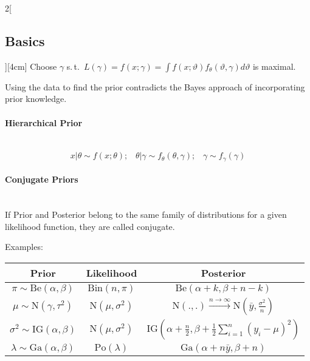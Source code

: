 \documentclass[8pt]{extarticle}
\begin{document}
\begin{multicols}{2}[\subsection{Basics}][4cm]
\noindent Choose $\gamma$ s.\,t.\ $L(\gamma) = f(x;\gamma) = \int f(x;\vartheta) f_\theta(\vartheta, \gamma)d\vartheta$ is maximal.

\noindent Using the data to find the prior contradicts the Bayes approach of incorporating prior knowledge.

\paragraph{Hierarchical Prior} \ \\

$$x|\theta \sim f(x;\theta);\;\;\; \theta|\gamma \sim f_\theta(\theta, \gamma);\;\;\; \gamma \sim f_\gamma(\gamma)$$

\paragraph{Conjugate Priors}

\begin{Extensiv}
~\\
  \noindent If Prior and Posterior belong to the same family of distributions for a given likelihood function, they are called conjugate. 
\end{Extensiv}

\vspace{0.5em}
\noindent Examples:
\vspace{-0.5em}
\begin{center}
\begin{tabular}{ccc}
Prior & Likelihood & Posterior\\
\hline
$\pi \sim\mathrm{Be}(\alpha,\beta)$ & $\mathrm{Bin}(n,\pi)$ & $\mathrm{Be}(\alpha {+} k, \beta {+} n {-} k)$\\
 $\mu \sim \mathrm{N}(\gamma, \tau^2)$ & $\mathrm{N}(\mu, \sigma^2)$ & $\mathrm{N}(.,.)\overset{n\rightarrow\infty}{\longrightarrow} \mathrm{N}(\bar{y}, \frac{\sigma^2}{n})$\\
 $\sigma^2 \sim \mathrm{IG}(\alpha, \beta)$ & $\mathrm{N}(\mu, \sigma^2)$ & $\mathrm{IG}(\alpha{+}\frac{n}{2},\beta{+}\frac{1}{2}\sum_{i=1}^{n}(y_i{-}\mu)^2)$\\
 $\lambda \sim \mathrm{Ga}(\alpha, \beta)$ & $\mathrm{Po}(\lambda)$ & $\mathrm{Ga}(\alpha{+}n\bar{y}, \beta{+}n)$\\
\end{tabular}
\end{center}

\end{multicols}
\end{document}
